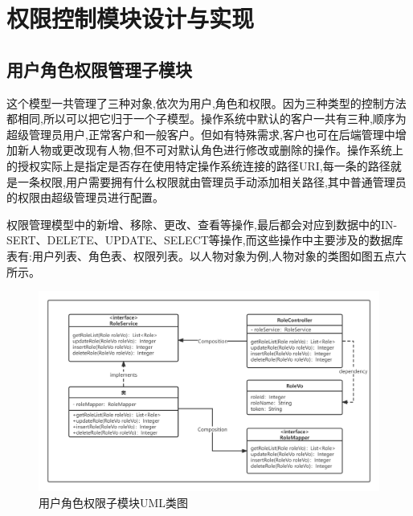 \section{权限控制模块设计与实现}

\subsection{用户角色权限管理子模块}



这个模型一共管理了三种对象,依次为用户,角色和权限。因为三种类型的控制方法都相同,所以可以把它归于一个子模型。操作系统中默认的客户一共有三种,顺序为超级管理员用户,正常客户和一般客户。但如有特殊需求,客户也可在后端管理中增加新人物或更改现有人物,但不可对默认角色进行修改或删除的操作。操作系统上的授权实际上是指定是否存在使用特定操作系统连接的路径URI,每一条的路径就是一条权限,用户需要拥有什么权限就由管理员手动添加相关路径,其中普通管理员的权限由超级管理员进行配置。

权限管理模型中的新增、移除、更改、查看等操作,最后都会对应到数据中的IN-SERT、DELETE、UPDATE、SELECT等操作,而这些操作中主要涉及的数据库表有:用户列表、角色表、权限列表。以人物对象为例,人物对象的类图如图五点六所示。

\begin{figure}[htb]
    \centering
    \includegraphics[width=1\textwidth]{my_figures/chapter5/用户角色权限子模块UML类图.png}
    \caption{用户角色权限子模块UML类图}
    \label{fig:用户角色权限子模块UML类图}
\end{figure}
 
